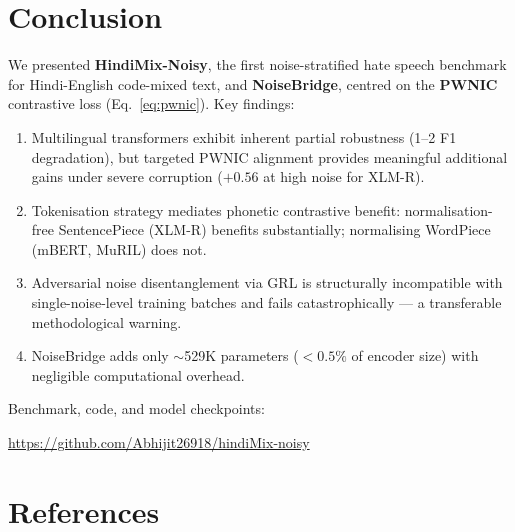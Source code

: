 \documentclass[12pt,a4paper]{report}
\begin{document}
\chapter{Conclusion}

We presented \textbf{HindiMix-Noisy}, the first noise-stratified hate speech benchmark for Hindi-English code-mixed text, and \textbf{NoiseBridge}, centred on the \textbf{PWNIC} contrastive loss (Eq.~\eqref{eq:pwnic}). Key findings:

\begin{enumerate}[leftmargin=*]
  \item Multilingual transformers exhibit inherent partial robustness (1--2 F1 degradation), but targeted PWNIC alignment provides meaningful additional gains under severe corruption ($+0.56$ at high noise for XLM-R).
  \item Tokenisation strategy mediates phonetic contrastive benefit: normalisation-free SentencePiece (XLM-R) benefits substantially; normalising WordPiece (mBERT, MuRIL) does not.
  \item Adversarial noise disentanglement via GRL is structurally incompatible with single-noise-level training batches and fails catastrophically --- a transferable methodological warning.
  \item NoiseBridge adds only $\sim$529K parameters ($<0.5\%$ of encoder size) with negligible computational overhead.
\end{enumerate}

\noindent Benchmark, code, and model checkpoints:
\begin{center}
  \url{https://github.com/Abhijit26918/hindiMix-noisy}
\end{center}

\chapter*{References}
\end{document}
